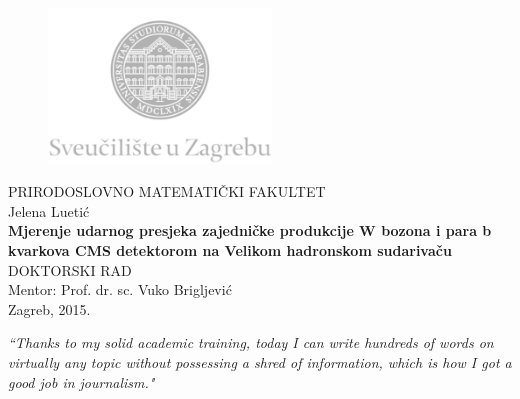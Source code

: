 \documentclass[12pt, oneside]{Thesis}
\begin{document}
\begin{titlepage}
  \fontsize{16pt}{20pt}\selectfont
  \selectfont
  \setlength{\intextsep}{0pt plus 0pt minus 0pt}

  \begin{center}
    \begin{figure}[ht!]
      \begin{center}
        \includegraphics[height=4.1184cm, width=5.94cm]{logo_unizg2}
      \end{center}
    \end{figure}		
    \vspace{0cm}
    {PRIRODOSLOVNO MATEMATIČKI FAKULTET} \\
    \vspace{3cm}
    Jelena Luetić \\
    \vspace{2cm}
    {\fontsize{22pt}{22pt}\selectfont\textbf{Mjerenje udarnog presjeka zajedničke produkcije W bozona i para b kvarkova CMS detektorom na Velikom hadronskom sudarivaču}} \\
    \vspace{2cm}    
    DOKTORSKI RAD \\
    \vspace{5cm}    %
    Mentor: Prof. dr. sc. Vuko Brigljević \\
    \vfill{Zagreb, 2015.}
  \end{center}
\end{titlepage}



\pagestyle{empty} %

\null\vfill %

\textit{``Thanks to my solid academic training, today I can write hundreds of words on virtually any topic without possessing a shred of information, which is how I got a good job in journalism."}
\end{document}
